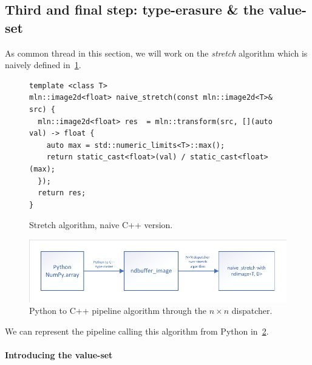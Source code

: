 \subsection{Third and final step: type-erasure \& the value-set}


As common thread in this section, we will work on the \emph{stretch} algorithm which is naively defined
in~\cref{fig:stretch.naive.code}.
\begin{figure}[htbp]
  \begin{verbatim}
template <class T>
mln::image2d<float> naive_stretch(const mln::image2d<T>& src) {
  mln::image2d<float> res  = mln::transform(src, [](auto val) -> float {
    auto max = std::numeric_limits<T>::max();
    return static_cast<float>(val) / static_cast<float>(max);
  });
  return res;
}
\end{verbatim}
  \caption{Stretch algorithm, naive C++ version.}
  \label{fig:stretch.naive.code}
\end{figure}

\begin{figure}[htbp]
  \centering
  \includegraphics[width=.8\linewidth]{../figures/static_dynamic_bridge/nxndispatch_pipeline}
  \caption{Python to C++ pipeline algorithm through the \(n \times n\) dispatcher.}
  \label{fig:static_dyn.nxndispatcher}
\end{figure}

We can represent the pipeline calling this algorithm from Python in~\cref{fig:static_dyn.nxndispatcher}.

\paragraph{Introducing the value-set}

